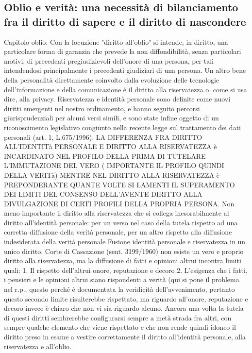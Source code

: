 \subsection{Oblio e verità: una necessità di bilanciamento fra il diritto di sapere e il diritto di nascondere}%
Capitolo oblio:
Con la locuzione "diritto all'oblio" si intende, in diritto, una particolare forma di garanzia che prevede la non diffondibilità, senza particolari motivi, di precedenti pregiudizievoli dell'onore di una persona, per tali intendendosi principalmente i precedenti giudiziari di una persona.
Un altro bene della personalità direttamente coinvolto dalla evoluzione delle tecnologie dell’informazione e della comunicazione è il diritto alla riservatezza o, come si usa dire, alla privacy.
Riservatezza e identità personale sono definite come nuovi diritti emergenti nel nostro ordinamento, e hanno seguito percorsi giurisprudenziali per alcuni versi simili, e sono state infine oggetto di un riconoscimento legislativo congiunto nella recente legge sul trattamento dei dati personali (art. 1, L.675/1996).
LA DIFFERENZA FRA DIRITTO ALL’IDENTITà PERSONALE E DIRITTO ALLA RISERVATEZZA è INCARDINATO NEL PROFILO DELLA PRIMA DI TUTELARE L’IMMUTAZIONE DEL VERO ( IMPORTANTE IL PROFILO QUINDI DELLA VERITà) MENTRE NEL DIRITTO ALLA RISERVATEZZA è PREPONDERANTE QUANTE VOLTE SI LAMENTI IL SUPERAMENTO DEI LIMITI DEL CONSENSO DELL’AVENTE DIRITTO ALLA DIVULGAZIONE DI CERTI PROFILI DELLA PROPRIA PERSONA.
Non meno importante il diritto alla riservatezza che si collega inesorabilmente al diritto all’identità personale: per un verso nel caso della tutela rispetto ad una corretta diffusione della verità personale, per un altro rispetto alla diffusione indesiderata della verità personale
Fusione identità personale e riservatezza in un unico diritto.
Corte di Cassazione (sent. 3199/1960) non esiste un vero e proprio diritto alla riservatezza, ma la diffusione di fatti e opinioni altrui incontra limiti quali:
1.	Il rispetto dell’altrui onore, reputazione e decoro
2.	L’esigenza che i fatti, i pensieri e le opinioni altrui siano rispondenti a verità (qui si pone il problema nel r.p., questo perché è documentata la veridicità dell’avvenimento, pertanto questo secondo limite risulterebbe rispettato, ma riguardo all’onore, reputazione e decoro invece è chiaro che non vi sia riguardo alcuno. Ancora una volta la tutela di questi diritti sembrerebbe configurarsi sempre a metà strada fra altri, con sempre qualche elemento che viene rispettato e che non rende quindi idoneo il diritto preso in esame a vestire correttamente il diritto all’identità personale, alla riservatezza e all’oblio.

